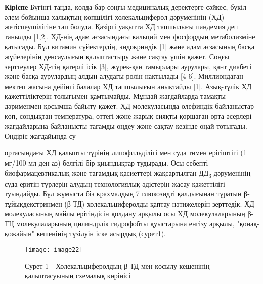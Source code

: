 \begin{multicols}{2}
{\bfseries Кіріспе} Бүгінгі таңда, қолда бар соңғы медициналық деректерге
сәйкес, бүкіл әлем бойынша халықтың көпшілігі холекальциферол
дәруменінің (ХД) жетіспеушілігіне тап болуда. Қазіргі уақытта ХД
тапшылығы пандемия деп танылды {[}1,2{]}. ХД-нің адам ағзасындағы
кальций мен фосфордың метаболизміне қатысады. Бұл витамин сүйектердің,
эндокриндік {[}1{]} және адам ағзасының басқа жүйелерінің денсаулығын
қалыптастыру және сақтау үшін қажет. Соңғы зерттеулер ХД-тің қатерлі
ісік {[}3{]}, жүрек-қан тамырлары аурулары, қант диабеті және басқа
аурулардың алдын алудағы рөлін нақтылады {[}4-6{]}. Миллиондаған мектеп
жасына дейінгі балалар ХД тапшылығын анықтайды {[}1{]}. Азық-түлік ХД
қажеттіліктерін толығымен қамтымайды. Мұндай жағдайларда тамақты
дәрименмен қосымша байыту қажет. ХД молекуласында олефиндік байланыстар
көп, сондықтан температура, оттегі және жарық сияқты қоршаған орта
әсерлері жағдайларына байланысты тағамды өңдеу және сақтау кезінде оңай
тотығады. Өндіріс жағдайында су

ортасындағы ХД қалыпты түрінің липофильділігі мен суда төмен ерігіштігі
(1 мг/100 мл-ден аз) белгілі бір қиындықтар тудырады. Осы себепті
биофармацевтикалық және тағамдық қасиеттері жақсартылған
ДД\textsubscript{3} дәруменінің суда еритін түрлерін алудың
технологиялық әдістерін жасау қажеттілігі туындайды. Бұл жұмыста біз
крахмалдың 7 глюкозидті қалдығынан тұратын β-тұйықдекстринмен (β-ТД)
холекальциферолды қаптау нәтижелерін зерттедік. ХД молекуласының майлы
ерітіндісін қолдану арқылы осы ХД молекулаларының β-ТЦ молекулаларының
цилиндрлік гидрофобты қуыстарына енгізу арқылы, "қонақ-қожайын"
кешенінің түзілуін іске асырдық (сурет1).
\end{multicols}

\begin{figure}[H]
  \centering
  \texttt{[image: image22]}
  \caption*{Сурет 1 - Холекальциферолдың β-ТД-мен қосылу кешенінің қалыптасуының схемалық көрінісі}
\end{figure}

